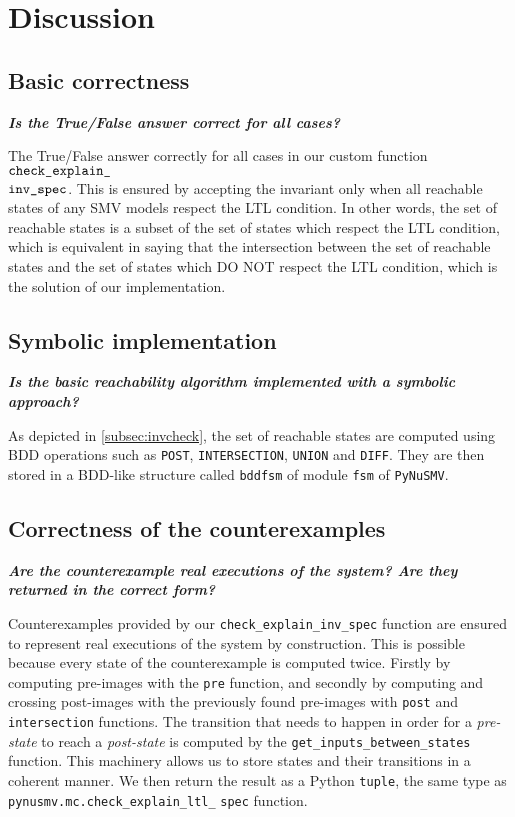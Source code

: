 \section{Discussion}
\subsection{Basic correctness}
\textbf{\textit{Is the True/False answer correct for all cases?}}

\medskip

The True/False answer correctly for all cases in our custom function $\verb|check_explain_|$\\$\verb|inv_spec|$. This is ensured by accepting the invariant only when all reachable states of any SMV models respect the LTL condition. In other words, the set of reachable states is a subset of the set of states which respect the LTL condition, which is equivalent in saying that the intersection between the set of reachable states and the set of states which DO NOT respect the LTL condition, which is the solution of our implementation.

\subsection{Symbolic implementation}
\textbf{\textit{Is the basic reachability algorithm implemented with a symbolic approach?}}

\medskip

As depicted in \ref{subsec:invcheck}, the set of reachable states are computed using BDD operations such as \texttt{POST}, \texttt{INTERSECTION}, \texttt{UNION} and \texttt{DIFF}. They are then stored in a BDD-like structure called \texttt{bddfsm} of module \texttt{fsm} of \texttt{PyNuSMV}.

\subsection{Correctness of the counterexamples}
\textbf{\textit{Are the counterexample real executions of the system? Are they returned in the correct form?}}

\medskip

Counterexamples provided by our \texttt{check\_explain\_inv\_spec} function are ensured to represent real executions of the system by construction. This is possible because every state of the counterexample is computed twice. Firstly by computing pre-images with the \texttt{pre} function, and secondly by computing and crossing post-images with the previously found pre-images with \texttt{post} and \texttt{intersection} functions. The transition that needs to happen in order for a \textit{pre-state} to reach a \textit{post-state} is computed by the \texttt{get\_inputs\_between\_states} function. This machinery allows us to store states and their transitions in a coherent manner. We then return the result as a Python \texttt{tuple}, the same type as \texttt{pynusmv.mc.check\_explain\_ltl\_} \texttt{spec} function.

